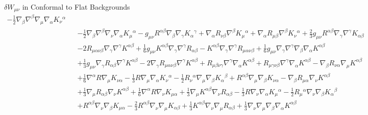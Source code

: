 \documentclass[8pt,aspectratio=1610]{beamer}
\begin{document}
\begin{frame}{$\delta W_{\mu\nu}$ in Conformal to Flat Backgrounds}
\begin{eqnarray}
	-  \tfrac{1}{2} \nabla_{\beta}\nabla^{\beta}\nabla_{\mu}\nabla_{\alpha}K_{\nu}{}^{\alpha} 
	\nonumber\\
	&&-  \tfrac{1}{2} \nabla_{\beta}\nabla^{\beta}\nabla_{\nu}\nabla_{\alpha}K_{\mu}{}^{\alpha} -  g_{\mu \nu} R^{\alpha \beta} \nabla_{\beta}\nabla_{\gamma}K_{\alpha}{}^{\gamma} + \nabla_{\alpha}R_{\nu \beta} \nabla^{\beta}K_{\mu}{}^{\alpha} + \nabla_{\alpha}R_{\mu \beta} \nabla^{\beta}K_{\nu}{}^{\alpha} + \tfrac{2}{3} g_{\mu \nu} R^{\alpha \beta} \nabla_{\gamma}\nabla^{\gamma}K_{\alpha \beta} 
	\nonumber\\
	&&- 2 R_{\mu \alpha \nu \beta} \nabla_{\gamma}\nabla^{\gamma}K^{\alpha \beta} + \tfrac{1}{6} g_{\mu \nu} K^{\alpha \beta} \nabla_{\gamma}\nabla^{\gamma}R_{\alpha \beta} -  K^{\alpha \beta} \nabla_{\gamma}\nabla^{\gamma}R_{\mu \alpha \nu \beta} + \tfrac{1}{6} g_{\mu \nu} \nabla_{\gamma}\nabla^{\gamma}\nabla_{\beta}\nabla_{\alpha}K^{\alpha \beta} 
	\nonumber\\
	&&+ \tfrac{1}{3} g_{\mu \nu} \nabla_{\gamma}R_{\alpha \beta} \nabla^{\gamma}K^{\alpha \beta} - 2 \nabla_{\gamma}R_{\mu \alpha \nu \beta} \nabla^{\gamma}K^{\alpha \beta} + R_{\mu \beta \nu \gamma} \nabla^{\gamma}\nabla_{\alpha}K^{\alpha \beta} + R_{\mu \gamma \nu \beta} \nabla^{\gamma}\nabla_{\alpha}K^{\alpha \beta} -  \nabla_{\beta}R_{\nu \alpha} \nabla_{\mu}K^{\alpha \beta} 
	\nonumber\\
	&&+ \tfrac{1}{6} \nabla^{\alpha}R \nabla_{\mu}K_{\nu \alpha} -  \tfrac{1}{3} R \nabla_{\mu}\nabla_{\alpha}K_{\nu}{}^{\alpha} -  \tfrac{1}{2} R_{\nu}{}^{\alpha} \nabla_{\mu}\nabla_{\beta}K_{\alpha}{}^{\beta} + R^{\alpha \beta} \nabla_{\mu}\nabla_{\beta}K_{\nu \alpha} -  \nabla_{\beta}R_{\mu \alpha} \nabla_{\nu}K^{\alpha \beta} 
	\nonumber\\
	&&+ \tfrac{1}{3} \nabla_{\mu}R_{\alpha \beta} \nabla_{\nu}K^{\alpha \beta} 
	+ \tfrac{1}{6} \nabla^{\alpha}R \nabla_{\nu}K_{\mu \alpha} + \tfrac{1}{3} \nabla_{\mu}K^{\alpha \beta} \nabla_{\nu}R_{\alpha \beta} -  \tfrac{1}{3} R \nabla_{\nu}\nabla_{\alpha}K_{\mu}{}^{\alpha} -  \tfrac{1}{2} R_{\mu}{}^{\alpha} \nabla_{\nu}\nabla_{\beta}K_{\alpha}{}^{\beta} 
	\nonumber\\
	&&+ R^{\alpha \beta} \nabla_{\nu}\nabla_{\beta}K_{\mu \alpha} -  \tfrac{2}{3} R^{\alpha \beta} \nabla_{\nu}\nabla_{\mu}K_{\alpha \beta} 
	+ \tfrac{1}{3} K^{\alpha \beta} \nabla_{\nu}\nabla_{\mu}R_{\alpha \beta} + \tfrac{1}{3} \nabla_{\nu}\nabla_{\mu}\nabla_{\beta}\nabla_{\alpha}K^{\alpha \beta}
	\label{AP54}
	\end{eqnarray}
\end{frame}
\end{document}
